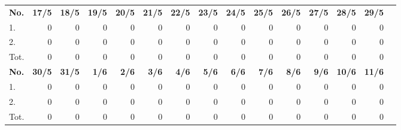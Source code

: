 \documentclass{article}
\begin{document}
\begin{table}[H]
    \centering
    \begin{tabularx}{\textwidth}{| X | r | r | r | r | r | r | r | r | r | r | r | r | r | r |}
        \Xhline{2pt}
        \textbf{No.} & \textbf{17/5} & \textbf{18/5} & \textbf{19/5} & \textbf{20/5} & \textbf{21/5} & \textbf{22/5} & \textbf{23/5} & \textbf{24/5} & \textbf{25/5} & \textbf{26/5} & \textbf{27/5} & \textbf{28/5} & \textbf{29/5} \\
        \Xhline{2pt}
        1. & 0 & 0 & 0 & 0 & 0 & 0 & 0 & 0 & 0 & 0 & 0 & 0 & 0 \\
        \hline
        2. & 0 & 0 & 0 & 0 & 0 & 0 & 0 & 0 & 0 & 0 & 0 & 0 & 0 \\
        \hline
        Tot. & 0 & 0 & 0 & 0 & 0 & 0 & 0 & 0 & 0 & 0 & 0 & 0 & 0 \\
        \Xhline{2pt}
        \textbf{No.} & \textbf{30/5} & \textbf{31/5} & \textbf{ 1/6} & \textbf{ 2/6} & \textbf{ 3/6} & \textbf{ 4/6} & \textbf{ 5/6} & \textbf{ 6/6} & \textbf{ 7/6} & \textbf{ 8/6} & \textbf{ 9/6} & \textbf{10/6} & \textbf{11/6} \\
        \Xhline{2pt}
        1. & 0 & 0 & 0 & 0 & 0 & 0 & 0 & 0 & 0 & 0 & 0 & 0 & 0 \\
        \hline
        2. & 0 & 0 & 0 & 0 & 0 & 0 & 0 & 0 & 0 & 0 & 0 & 0 & 0 \\
        \hline
        Tot. & 0 & 0 & 0 & 0 & 0 & 0 & 0 & 0 & 0 & 0 & 0 & 0 & 0 \\
        \hline
    \end{tabularx}
\end{table}
\vspace{0.5cm}
\end{document}
